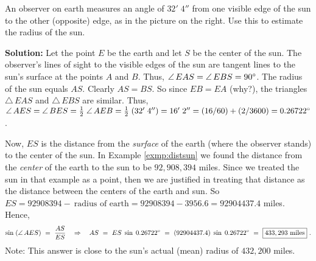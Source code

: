 \begin{exmp}\label{exmp:radsun}
\noindent An observer on earth measures an angle of $32'\;4''$ from one visible edge of the sun to the other
 (opposite) edge, as in the picture on the right. Use this to estimate the radius of the
 sun.\vspace{1mm}
 \par\noindent\textbf{Solution:} Let the point $E$ be the earth and let $S$ be the center of the sun.
 The observer's lines of sight to the visible edges of the sun are tangent lines to the sun's
 surface at
 the points $A$ and $B$. Thus, $\angle\,EAS = \angle\,EBS = 90^\circ$. The radius of the sun
 equals $AS$. Clearly $AS = BS$. So since $EB = EA$ (why?), the triangles
 $\triangle\,EAS$ and $\triangle\,EBS$ are similar. Thus, $\angle\,AES = \angle\,BES = \frac{1}{2}\;
 \angle\,AEB = \frac{1}{2}\;(32'\;4'') = 16'\;2'' = (16/60) + (2/3600) = 0.26722^\circ$.

 Now, $ES$ is the distance from the \emph{surface} of the earth (where the observer stands) to the
 center of the sun. In Example \ref{exmp:distsun} we found the distance from the \emph{center} of
 the earth to the sun to be $92,908,394$ miles. Since we treated the sun in that example as a point,
 then we are justified in treating that distance as the distance between the centers of the earth
 and sun. So $ES = 92908394 - ~\text{radius of earth} = 92908394 - 3956.6 = 92904437.4$ miles.
 Hence,
 \begin{displaymath}
  \sin\;(\angle\,AES) ~=~ \frac{AS}{ES} \quad\Rightarrow\quad AS ~=~ ES \;\sin\;0.26722^\circ
  ~=~ (92904437.4)\;\sin\;0.26722^\circ ~=~ \boxed{433,293 ~\text{miles}} ~.
 \end{displaymath}
 Note: This answer is close to the sun's actual (mean) radius of $432,200$ miles.
\end{exmp}\vspace{-4mm}
